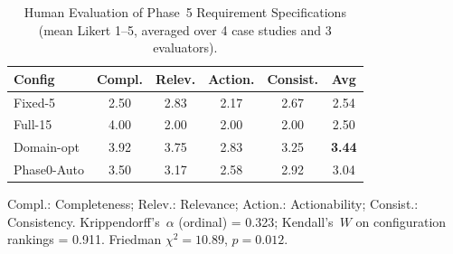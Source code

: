 \begin{table}[t]
\centering
\caption{Human Evaluation of Phase~5 Requirement Specifications (mean Likert 1--5, averaged over 4 case studies and 3 evaluators).}
\label{tab:humaneval}
\begin{tabular}{l ccccc}
\toprule
\textbf{Config} & \textbf{Compl.} & \textbf{Relev.} & \textbf{Action.} & \textbf{Consist.} & \textbf{Avg} \\
\midrule
Fixed-5 & 2.50 & 2.83 & 2.17 & 2.67 & 2.54 \\
Full-15 & 4.00 & 2.00 & 2.00 & 2.00 & 2.50 \\
Domain-opt & 3.92 & 3.75 & 2.83 & 3.25 & \textbf{3.44} \\
Phase0-Auto & 3.50 & 3.17 & 2.58 & 2.92 & 3.04 \\
\bottomrule
\end{tabular}
\begin{minipage}{\columnwidth}
\vspace{4pt}
\footnotesize
Compl.: Completeness; Relev.: Relevance; Action.: Actionability; Consist.: Consistency. Krippendorff's~$\alpha$ (ordinal) = 0.323; Kendall's~$W$ on configuration rankings = 0.911. Friedman $\chi^2=10.89$, $p=0.012$.
\end{minipage}
\end{table}
